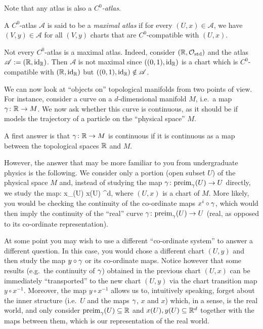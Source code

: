 Note that any atlas is also a \emph{$C^0$-atlas}.

\bd
A $C^0$-atlas $\mathscr{A}$ is said to be a \emph{maximal atlas} if for every $(U,x)\in\mathscr{A}$, we have $(V,y)\in\mathscr{A}$ for all $(V,y)$ charts that are $C^0$-compatible with $(U,x)$.
\ed

\be
Not every $C^0$-atlas is a maximal atlas. Indeed, consider $(\mathbb{R},\mathcal{O}_\mathrm{std})$ and the atlas $\mathscr{A}:=(\mathbb{R},\operatorname{id}_{\mathbb{R}})$. Then $\mathscr{A}$ is not maximal since $((0,1),\operatorname{id}_{\mathbb{R}})$ is a chart which is $C^0$-compatible with $(\mathbb{R},\operatorname{id}_{\mathbb{R}})$ but $((0,1),\operatorname{id}_{\mathbb{R}}) \notin \mathscr{A}$.
\ee

We can now look at ``objects on'' topological manifolds from two points of view. For instance, consider a curve on a $d$-dimensional manifold $M$, i.e.\ a map $\gamma\colon \mathbb{R}\to M$. We now ask whether this curve is continuous, as it should be if models the trajectory of a particle on the ``physical space'' $M$.

A first answer is that $\gamma\colon \mathbb{R} \to M$ is continuous if it is continuous as a map between the topological spaces $\mathbb{R}$ and $M$.

However, the answer that may be more familiar to you from undergraduate physics is the following. We consider only a portion (open subset $U$) of the physical space $M$ and, instead of studying the map $\gamma\colon\mathrm{preim}_\gamma(U)\to U$ directly, we study the map:
\bse
x\circ \g\cl {}_\g(U) \to x(U) \se \R^d,
\ese
where $(U,x)$ is a chart of $M$. More likely, you would be checking the continuity of the co-ordinate maps $x^i\circ \gamma$, which would then imply the continuity of the ``real'' curve $\gamma\colon\mathrm{preim}_\gamma(U)\to U$ (real, as opposed to its co-ordinate representation).
\bse
{}
\ese
At some point you may wish to use a different ``co-ordinate system'' to answer a different question. In this case, you would chose a different chart $(U,y)$ and then study the map $y\circ \gamma$ or its co-ordinate maps. Notice however that some results (e.g.\ the continuity of $\gamma$) obtained in the previous chart $(U,x)$ can be immediately ``transported'' to the new chart $(U,y)$ via the chart transition map $y\circ x^{-1}$. Moreover, the map $y\circ x^{-1}$ allows us to, intuitively speaking, forget about the inner structure (i.e.\ $U$ and the maps $\gamma$, $x$ and $x$) which, in a sense, is the real world, and only consider $\mathrm{preim}_\gamma(U)\subseteq \mathbb{R}$ and $x(U),y(U)\subseteq\mathbb{R}^d$ together with the maps between them, which is our representation of the real world.














